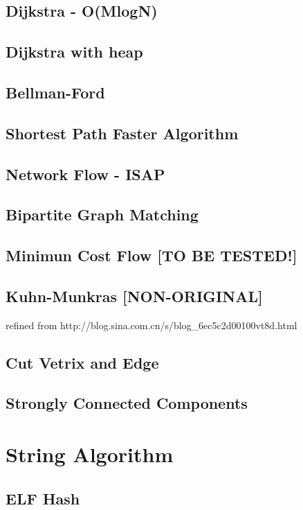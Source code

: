 \documentclass[a4paper]{article}
\begin{document}
\subsection{Dijkstra - O(MlogN)}

\subsection{Dijkstra with heap}

\subsection{Bellman-Ford}

\subsection{Shortest Path Faster Algorithm}

\subsection{Network Flow - ISAP}

\subsection{Bipartite Graph Matching}

\subsection{Minimun Cost Flow [TO BE TESTED!]}

\subsection{Kuhn-Munkras [NON-ORIGINAL]}
refined from http://blog.sina.com.cn/s/blog\_6ec5c2d00100vt8d.html

\subsection{Cut Vetrix and Edge}

\subsection{Strongly Connected Components}

\section{String Algorithm}
\subsection{ELF Hash}

\end{document}
